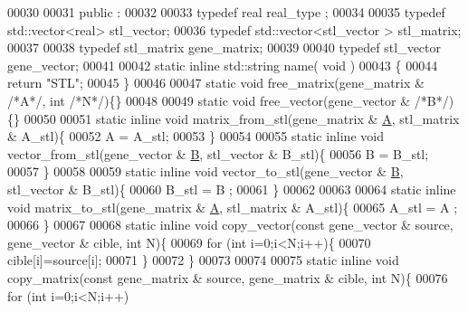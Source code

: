 \begin{DoxyCode}
00030 
00031 public :
00032 
00033   \textcolor{keyword}{typedef} real real\_type ;
00034 
00035   \textcolor{keyword}{typedef} std::vector<real>  stl\_vector;
00036   \textcolor{keyword}{typedef} std::vector<stl\_vector > stl\_matrix;
00037 
00038   \textcolor{keyword}{typedef} stl\_matrix gene\_matrix;
00039 
00040   \textcolor{keyword}{typedef} stl\_vector gene\_vector;
00041 
00042   \textcolor{keyword}{static} \textcolor{keyword}{inline} std::string name( \textcolor{keywordtype}{void} )
00043   \{
00044     \textcolor{keywordflow}{return} \textcolor{stringliteral}{"STL"};
00045   \}
00046 
00047   \textcolor{keyword}{static} \textcolor{keywordtype}{void} free\_matrix(gene\_matrix & \textcolor{comment}{/*A*/}, \textcolor{keywordtype}{int} \textcolor{comment}{/*N*/})\{\}
00048 
00049   \textcolor{keyword}{static} \textcolor{keywordtype}{void} free\_vector(gene\_vector & \textcolor{comment}{/*B*/})\{\}
00050 
00051   \textcolor{keyword}{static} \textcolor{keyword}{inline} \textcolor{keywordtype}{void} matrix\_from\_stl(gene\_matrix & \hyperlink{group___core___module_class_eigen_1_1_matrix}{A}, stl\_matrix & A\_stl)\{
00052     A = A\_stl;
00053   \}
00054 
00055   \textcolor{keyword}{static} \textcolor{keyword}{inline} \textcolor{keywordtype}{void} vector\_from\_stl(gene\_vector & \hyperlink{group___core___module_class_eigen_1_1_matrix}{B}, stl\_vector & B\_stl)\{
00056     B = B\_stl;
00057   \}
00058 
00059   \textcolor{keyword}{static} \textcolor{keyword}{inline} \textcolor{keywordtype}{void} vector\_to\_stl(gene\_vector & \hyperlink{group___core___module_class_eigen_1_1_matrix}{B}, stl\_vector & B\_stl)\{
00060     B\_stl = B ;
00061   \}
00062 
00063 
00064   \textcolor{keyword}{static} \textcolor{keyword}{inline} \textcolor{keywordtype}{void} matrix\_to\_stl(gene\_matrix & \hyperlink{group___core___module_class_eigen_1_1_matrix}{A}, stl\_matrix & A\_stl)\{
00065     A\_stl = A ;
00066   \}
00067 
00068   \textcolor{keyword}{static} \textcolor{keyword}{inline} \textcolor{keywordtype}{void} copy\_vector(\textcolor{keyword}{const} gene\_vector & source, gene\_vector & cible, \textcolor{keywordtype}{int} N)\{
00069     \textcolor{keywordflow}{for} (\textcolor{keywordtype}{int} i=0;i<N;i++)\{
00070       cible[i]=source[i];
00071     \}
00072   \}
00073 
00074 
00075   \textcolor{keyword}{static} \textcolor{keyword}{inline} \textcolor{keywordtype}{void} copy\_matrix(\textcolor{keyword}{const} gene\_matrix & source, gene\_matrix & cible, \textcolor{keywordtype}{int} N)\{
00076     \textcolor{keywordflow}{for} (\textcolor{keywordtype}{int} i=0;i<N;i++)

\end{DoxyCode}
